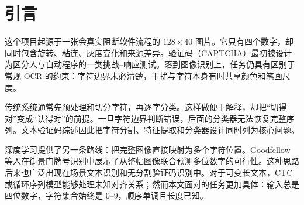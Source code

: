 \documentclass[UTF8,12pt,a4paper]{ctexart}
\begin{document}
\begin{abstract}
文本验证码常被描述为字符分割与逐字符分类的组合问题，但当验证码长度固定、字符集合有限且横向顺序稳定时，显式切割未必是最自然的建模方式。本文围绕三个真实来源的四位数字验证码，设计并复盘了一套完整图像输入、单次前向传播输出四个位置类别的轻量级识别方案。该方案始终保留完整输入，并在卷积特征空间中通过位置保持池化建立四个横向特征槽位，以四个分类头输出形状为 $[B,4,10]$ 的 logits。项目从 Flatten、Medium、Position、Wide Position 逐步演化到带深度可分离残差块的 Position-DS，并采用受控增强、指数滑动平均、困难样本重放与三随机种子模型集成。

实验材料记录了模型从失败到可用的过程：746 张样本上的五折实验中，Flatten 与 Medium 的整码准确率分别仅为 0 和 0.27\%，Position 在无增强与轻量增强下提高到 1.47\% 和 5.50\%；后续 Position 在时间留出集上达到 19.60\%，Wide Position 在跨批次留出集上达到 50.00\%。最终 Position-DS 三模型集成在 481 张多来源留出集上取得 98.80\% 的字符准确率、96.05\% 的整码准确率和 0.0478 的汉明错误。由于其中 218 张样本曾参与早期方案选择，本文将该结果称为“多来源留出评估”，不使用“完全盲测”的表述。最终模型导出为 1,173,896 字节的 ONNX 文件，PyTorch 与 ONNX Runtime 的最大 logits 误差为 $1.55\times10^{-6}$。本文聚焦于高度约束实际任务中的归纳偏置选择，以及实验模型向可复现、可部署工程状态的推进过程。

\noindent\textbf{关键词：}验证码识别；卷积神经网络；无分割识别；位置先验；多头分类；ONNX
\end{abstract}

\clearpage
\begingroup
\setcounter{tocdepth}{1}
\linespread{1.12}\selectfont
\tableofcontents
\endgroup
\clearpage

\section{引言}

这个项目起源于一张会真实阻断软件流程的 $128\times40$ 图片。它只有四个数字，却同时包含旋转、粘连、灰度变化和来源差异。验证码（CAPTCHA）最初被设计为区分人与自动程序的一类挑战--响应测试\cite{vonahn2003captcha}。落到图像识别上，任务仍具有区别于常规 OCR 的约束：字符边界未必清楚，干扰与字符本身有时共享颜色和笔画尺度。

传统系统通常先预处理和切分字符，再逐字分类。这样做便于解释，却把“切得对”变成“认得对”的前提。一旦字符边界判断错误，后面的分类器无法恢复完整序列。文本验证码综述因此把字符分割、特征提取和分类器设计同时列为核心问题\cite{chen2017survey}。

深度学习提供了另一条路线：把完整图像直接映射为多个字符位置。Goodfellow 等人在街景门牌号识别中展示了从整幅图像联合预测多位数字的可行性\cite{goodfellow2014multidigit}。这种思路后来也广泛出现在场景文本识别和无分割验证码识别中。对于可变长文本，CTC 或循环序列模型能够处理未知对齐关系\cite{graves2006ctc,shi2017crnn}；然而本文面对的任务更加具体：输入总是四位数字，字符集合始终是 $0$--$9$，顺序单调且长度已知。
\end{document}
